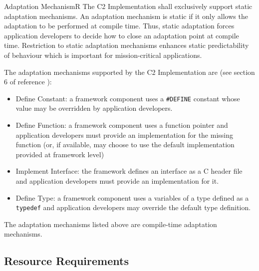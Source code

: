 \documentclass{pnp_article}
\begin{document}
\begin{fwReqNote}{Adaptation Mechanism}{R}
{The C2 Implementation shall exclusively support static adaptation mechanisms.}
{An adaptation mechanism is static if it only allows the adaptation to be performed at compile time. Thus, static adaptation forces application developers to decide how to close an adaptation point at compile time.}
{Restriction to static adaptation mechanisms enhances static predictability of behaviour which is important for mission-critical applications.}
{The adaptation mechanisms supported by the C2 Implementation are (see section 6 of reference \cite{ref:C2Implementation}):

\begin{itemize}
\item Define Constant: a framework component uses a \texttt{\#DEFINE} constant whose value may be overridden by application developers.
\item Define Function: a framework component uses a function pointer and application developers must provide an implementation for the missing function (or, if available, may choose to use the default implementation provided at framework level)
\item Implement Interface: the framework defines an interface as a C header file and application developers must provide an implementation for it.
\item Define Type: a framework component uses a variables of a type defined as a \texttt{typedef} and application developers may override the default type definition.
\end{itemize} } 
{The adaptation mechanisms listed above are compile-time adaptation mechanisms.}
\end{fwReqNote}


\subsection{Resource Requirements}\label{req:resourceReqs}
\end{document}
